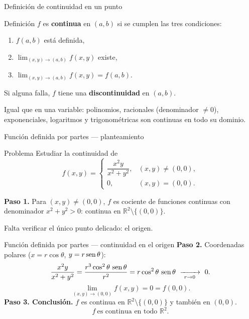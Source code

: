 \documentclass[11pt,aspectratio=169]{beamer}
\begin{document}
\begin{frame}{Definición de continuidad en un punto}
  \begin{block}{Definición}
    $f$ es \textbf{continua} en $(a,b)$ si se cumplen las tres condiciones:
    \begin{enumerate}
      \item $f(a,b)$ está definida,
      \item $\displaystyle\lim_{(x,y)\to(a,b)} f(x,y)$ existe,
      \item $\displaystyle\lim_{(x,y)\to(a,b)} f(x,y)=f(a,b)$.
    \end{enumerate}
  \end{block}
  \pause
  \begin{center}\normalsize Si alguna falla, $f$ tiene una \textbf{discontinuidad} en $(a,b)$.\end{center}
  \pause
  \vspace{4pt}
  \begin{center}\small\color{gray60} Igual que en una variable: polinomios, racionales (denominador $\neq 0$), exponenciales, logaritmos y trigonométricas son continuas en todo su dominio.\end{center}
\end{frame}

\begin{frame}{Función definida por partes --- planteamiento}
  \begin{block}{Problema}
    Estudiar la continuidad de
    \[
      f(x,y)=\begin{cases}
        \dfrac{x^2y}{x^2+y^2}, & (x,y)\neq(0,0),\\[10pt]
        0, & (x,y)=(0,0).
      \end{cases}
    \]
  \end{block}
  \pause
  \textbf{Paso 1.} Para $(x,y)\neq(0,0)$, $f$ es cociente de funciones continuas con denominador $x^2+y^2>0$: continua en $\mathbb R^2\setminus\{(0,0)\}$.
  \pause
  \begin{center}\small\color{gray60} Falta verificar el único punto delicado: el origen.\end{center}
\end{frame}

\begin{frame}{Función definida por partes --- continuidad en el origen}
  \textbf{Paso 2.} Coordenadas polares ($x=r\cos\theta$, $y=r\operatorname{sen}\theta$):
  \[
    \frac{x^2y}{x^2+y^2}=\frac{r^3\cos^2\theta\,\operatorname{sen}\theta}{r^2}
    =r\cos^2\theta\,\operatorname{sen}\theta\ \xrightarrow[\ r\to 0\ ]{}\ 0.
  \]
  \pause
  \[
    \lim_{(x,y)\to(0,0)} f(x,y)=0=f(0,0).
  \]
  \pause
  \textbf{Paso 3. Conclusión.} $f$ es continua en $\mathbb R^2\setminus\{(0,0)\}$ y también en $(0,0)$.
  \pause
  \[
    \boxed{f\ \text{es continua en todo }\mathbb R^2.}
  \]
\end{frame}
\end{document}

